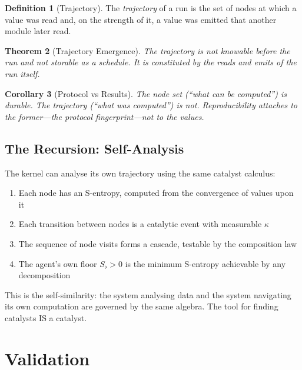 \documentclass[11pt,a4paper]{article}
\newtheorem{theorem}{Theorem}[section]
\newtheorem{corollary}[theorem]{Corollary}
\theoremstyle{definition}
\newtheorem{definition}[theorem]{Definition}
\theoremstyle{remark}
\newcommand{\Sfloor}{S_{\flat}}
\begin{document}
\begin{definition}[Trajectory]
The \emph{trajectory} of a run is the set of nodes at which a value was read and, on the strength of it, a value was emitted that another module later read.
\end{definition}

\begin{theorem}[Trajectory Emergence]
\label{thm:emergence-kernel}
The trajectory is not knowable before the run and not storable as a schedule. It is constituted by the reads and emits of the run itself.
\end{theorem}

\begin{corollary}[Protocol vs Results]
The node set (``what can be computed'') is durable. The trajectory (``what was computed'') is not. Reproducibility attaches to the former---the protocol fingerprint---not to the values.
\end{corollary}

\subsection{The Recursion: Self-Analysis}

The kernel can analyse its own trajectory using the same catalyst calculus:

\begin{enumerate}[nosep]
\item Each node has an S-entropy, computed from the convergence of values upon it
\item Each transition between nodes is a catalytic event with measurable $\kappa$
\item The sequence of node visits forms a cascade, testable by the composition law
\item The agent's own floor $\Sfloor > 0$ is the minimum S-entropy achievable by any decomposition
\end{enumerate}

This is the self-similarity: the system analysing data and the system navigating its own computation are governed by the same algebra. The tool for finding catalysts IS a catalyst.

\section{Validation}
\label{sec:validation}
\end{document}
